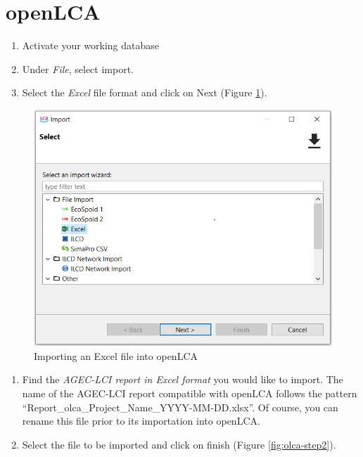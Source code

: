 \documentclass[openany]{book}
\begin{document}
\hypertarget{import-olca}{%
\section{openLCA}\label{import-olca}}

\begin{enumerate}
\def\labelenumi{\arabic{enumi}.}
\item
  Activate your working database
\item
  Under \emph{File}, select import.
\item
  Select the \emph{Excel} file format and click on Next (Figure \ref{fig:olca-step1}).
\end{enumerate}

\begin{figure}[ht]

{\centering \includegraphics[width=0.7\linewidth]{Figures/olca_step1} 

}

\caption{Importing an Excel file into openLCA}\label{fig:olca-step1}
\end{figure}

\begin{enumerate}
\def\labelenumi{\arabic{enumi}.}
\setcounter{enumi}{3}
\item
  Find the \emph{AGEC-LCI report in Excel format} you would like to import. The name of the AGEC-LCI report compatible with openLCA follows the pattern ``Report\_olca\_Project\_Name\_YYYY-MM-DD.xlsx''. Of course, you can rename this file prior to its importation into openLCA.
\item
  Select the file to be imported and click on finish (Figure \ref{fig:olca-step2}).
\end{enumerate}
\end{document}
